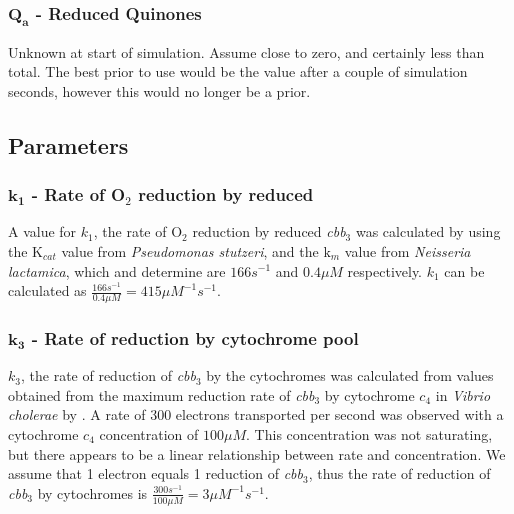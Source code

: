 \subsubsection*{$\mathbf{Q_a}$ {\bf- Reduced Quinones}}
Unknown at start of simulation. Assume close to zero, and certainly less than total. The best prior to use would be the value after a couple of simulation seconds, however this would no longer be a prior.

\subsection*{Parameters}
\subsubsection*{$\mathbf{k_1}$ {\bf- Rate of O$_{\textrm{2}}$ reduction by reduced \cbbthree{}}}

A value for $k_1$, the rate of O$_{\textrm{2}}$ reduction by reduced \textit{cbb$_{\textrm{3}}$} was calculated by using the $\mathrm{K}_{cat}$ value from \textit{Pseudomonas stutzeri}, and the $\textrm{k}_m$ value from \textit{Neisseria lactamica}, which \citet{Forte2001} and \citet{Hunter2007} determine are $166s^{-1}$ and $0.4\mu M$ respectively. $k_1$ can be calculated as $\frac{166s^{-1}}{0.4\mu M} = 415\mu M^{-1} s^{-1}$.

\subsubsection*{$\mathbf{k_3}$ {\bf- Rate of \cbbthree{} reduction by cytochrome pool}}
$k_3$, the rate of reduction of \textit{cbb$_{\textrm{3}}$} by the cytochromes was calculated from values obtained from the maximum reduction rate of \textit{cbb$_{\textrm{3}}$} by cytochrome $c_4$ in \textit{Vibrio cholerae} by \citet{Chang2010}. A rate of 300 electrons transported per second was observed with a cytochrome $c_4$ concentration of $100\mu M$. This concentration was not saturating, but there appears to be a linear relationship between rate and concentration. We assume that 1 electron equals 1 reduction of \textit{cbb$_{\textrm{3}}$}, thus the rate of reduction of \textit{cbb$_{\textrm{3}}$} by cytochromes is $\frac{300s^{-1}}{100\mu M} = 3\mu M^{-1} s^{-1}$.


